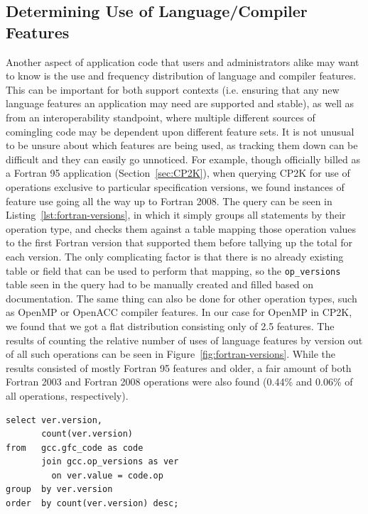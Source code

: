 \subsection{Determining Use of Language/Compiler Features}
Another aspect of application code that users and administrators alike may want to know is the use and frequency distribution of language and compiler features.
This can be important for both support contexts (i.e. ensuring that any new language features an application may need are supported and stable), as well as from an interoperability standpoint, where multiple different sources of comingling code may be dependent upon different feature sets.
It is not unusual to be unsure about which features are being used, as tracking them down can be difficult and they can easily go unnoticed.
For example, though officially billed as a Fortran 95 application (Section~\ref{sec:CP2K}), when querying CP2K for use of operations exclusive to particular specification versions, we found instances of feature use going all the way up to Fortran 2008.
The query can be seen in Listing~\ref{lst:fortran-versions}, in which it simply groups all statements by their operation type, and checks them against a table mapping those operation values to the first Fortran version that supported them before tallying up the total for each version.
The only complicating factor is that there is no already existing table or field that can be used to perform that mapping, so the \texttt{op\_versions} table seen in the query had to be manually created and filled based on documentation.
The same thing can also be done for other operation types, such as OpenMP or OpenACC compiler features.
In our case for OpenMP in CP2K, we found that we got a flat distribution consisting only of 2.5 features.
The results of counting the relative number of uses of language features by version out of all such operations can be seen in Figure~\ref{fig:fortran-versions}.
While the results consisted of mostly Fortran 95 features and older, a fair amount of both Fortran 2003 and Fortran 2008 operations were also found (0.44\% and 0.06\% of all operations, respectively).

\begin{lstlisting}[caption=Querying for Use of Fortran Language Features, label=lst:fortran-versions]
select ver.version,
       count(ver.version)
from   gcc.gfc_code as code
       join gcc.op_versions as ver
         on ver.value = code.op
group  by ver.version
order  by count(ver.version) desc;
\end{lstlisting}

